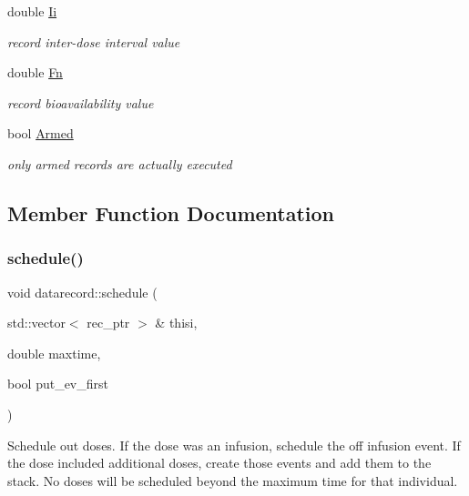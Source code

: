 \begin{DoxyCompactItemize}
\mbox{\label{classdatarecord_ac70f26d0132e5e11160c0cefa06a6ea7}} 
double \hyperlink{classdatarecord_ac70f26d0132e5e11160c0cefa06a6ea7}{Ii}
\begin{DoxyCompactList}\small\item\em record inter-\/dose interval value \end{DoxyCompactList}\item 
\mbox{\label{classdatarecord_aad15b937002d15589dfee6e478a0bd22}} 
double \hyperlink{classdatarecord_aad15b937002d15589dfee6e478a0bd22}{Fn}
\begin{DoxyCompactList}\small\item\em record bioavailability value \end{DoxyCompactList}\item 
\mbox{\label{classdatarecord_ac8cd42838bb397a34d97dd495a58f0cf}} 
bool \hyperlink{classdatarecord_ac8cd42838bb397a34d97dd495a58f0cf}{Armed}
\begin{DoxyCompactList}\small\item\em only armed records are actually executed \end{DoxyCompactList}\end{DoxyCompactItemize}


\subsection{Member Function Documentation}
\mbox{\label{classdatarecord_aaf2f67fbf31989c3fa6896126ac24ef9}} 
\subsubsection{\texorpdfstring{schedule()}{schedule()}}
{\footnotesize\ttfamily void datarecord\+::schedule (\begin{DoxyParamCaption}\item[{std\+::vector$<$ rec\+\_\+ptr $>$ \&}]{thisi,  }\item[{double}]{maxtime,  }\item[{bool}]{put\+\_\+ev\+\_\+first }\end{DoxyParamCaption})}

Schedule out doses. If the dose was an infusion, schedule the off infusion event. If the dose included additional doses, create those events and add them to the stack. No doses will be scheduled beyond the maximum time for that individual.


